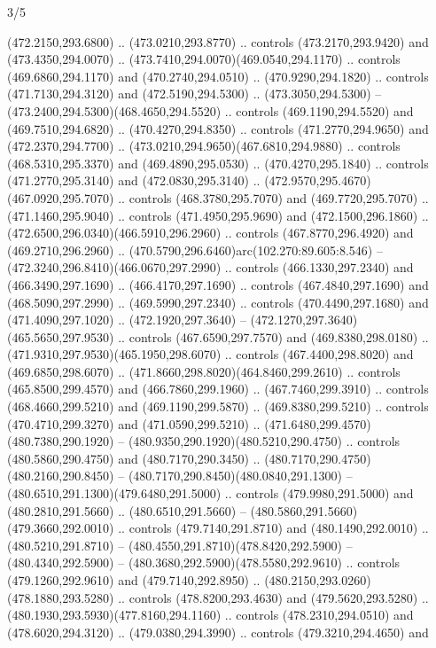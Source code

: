 \begin{flagdescription}{3/5}
\begin{scope}[shift={(0.5\flaglength,0.5\flagwidth)},scale=\flagwidth/1075]
\begin{scope}[y=0.80pt, x=0.80pt, yscale=-2.37, xscale=2.37,xshift=-402,yshift=-230.4]
  (472.2150,293.6800) .. (473.0210,293.8770) .. controls (473.2170,293.9420) and
  (473.4350,294.0070) .. (473.7410,294.0070)(469.0540,294.1170) .. controls
  (469.6860,294.1170) and (470.2740,294.0510) .. (470.9290,294.1820) .. controls
  (471.7130,294.3120) and (472.5190,294.5300) .. (473.3050,294.5300) --
  (473.2400,294.5300)(468.4650,294.5520) .. controls (469.1190,294.5520) and
  (469.7510,294.6820) .. (470.4270,294.8350) .. controls (471.2770,294.9650) and
  (472.2370,294.7700) .. (473.0210,294.9650)(467.6810,294.9880) .. controls
  (468.5310,295.3370) and (469.4890,295.0530) .. (470.4270,295.1840) .. controls
  (471.2770,295.3140) and (472.0830,295.3140) ..
  (472.9570,295.4670)(467.0920,295.7070) .. controls (468.3780,295.7070) and
  (469.7720,295.7070) .. (471.1460,295.9040) .. controls (471.4950,295.9690) and
  (472.1500,296.1860) .. (472.6500,296.0340)(466.5910,296.2960) .. controls
  (467.8770,296.4920) and (469.2710,296.2960) ..
  (470.5790,296.6460)arc(102.270:89.605:8.546) --
  (472.3240,296.8410)(466.0670,297.2990) .. controls (466.1330,297.2340) and
  (466.3490,297.1690) .. (466.4170,297.1690) .. controls (467.4840,297.1690) and
  (468.5090,297.2990) .. (469.5990,297.2340) .. controls (470.4490,297.1680) and
  (471.4090,297.1020) .. (472.1920,297.3640) --
  (472.1270,297.3640)(465.5650,297.9530) .. controls (467.6590,297.7570) and
  (469.8380,298.0180) .. (471.9310,297.9530)(465.1950,298.6070) .. controls
  (467.4400,298.8020) and (469.6850,298.6070) ..
  (471.8660,298.8020)(464.8460,299.2610) .. controls (465.8500,299.4570) and
  (466.7860,299.1960) .. (467.7460,299.3910) .. controls (468.4660,299.5210) and
  (469.1190,299.5870) .. (469.8380,299.5210) .. controls (470.4710,299.3270) and
  (471.0590,299.5210) .. (471.6480,299.4570)(480.7380,290.1920) --
  (480.9350,290.1920)(480.5210,290.4750) .. controls (480.5860,290.4750) and
  (480.7170,290.3450) .. (480.7170,290.4750)(480.2160,290.8450) --
  (480.7170,290.8450)(480.0840,291.1300) --
  (480.6510,291.1300)(479.6480,291.5000) .. controls (479.9980,291.5000) and
  (480.2810,291.5660) .. (480.6510,291.5660) --
  (480.5860,291.5660)(479.3660,292.0010) .. controls (479.7140,291.8710) and
  (480.1490,292.0010) .. (480.5210,291.8710) --
  (480.4550,291.8710)(478.8420,292.5900) -- (480.4340,292.5900) --
  (480.3680,292.5900)(478.5580,292.9610) .. controls (479.1260,292.9610) and
  (479.7140,292.8950) .. (480.2150,293.0260)(478.1880,293.5280) .. controls
  (478.8200,293.4630) and (479.5620,293.5280) ..
  (480.1930,293.5930)(477.8160,294.1160) .. controls (478.2310,294.0510) and
  (478.6020,294.3120) .. (479.0380,294.3990) .. controls (479.3210,294.4650) and

\end{scope}
\end{scope}
\end{flagdescription}
